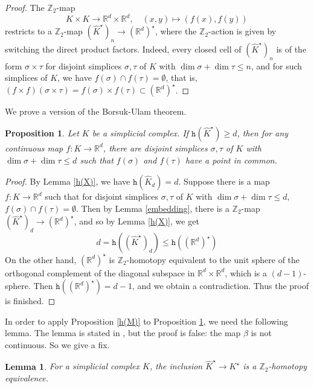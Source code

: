 \documentclass[amsfonts]{amsart}
\numberwithin{equation}{section}
\newtheorem{proposition}[theorem]{Proposition}
\newtheorem{lemma}[theorem]{Lemma}
\theoremstyle{definition}
\theoremstyle{remark}
\newcommand{\Z}{\mathbb{Z}}
\newcommand{\R}{\mathbb{R}}
\newcommand{\h}{\mathtt{h}}
\begin{document}
  \begin{proof}
    The $\Z_2$-map
    \[
      K\times K\to\R^d\times\R^d,\quad(x,y)\mapsto (f(x),f(y))
    \]
    restricts to a $\Z_2$-map $(\widehat{K}^\star)_n\to(\R^d)^\star$, where the $\Z_2$-action is given by switching the direct product factors. Indeed, every closed cell of $(\widehat{K}^\star)_n$ is of the form $\sigma\times\tau$ for disjoint simplices $\sigma,\tau$ of $K$ with $\dim\sigma+\dim\tau\le n$, and for such simplices of $K$, we have $f(\sigma)\cap f(\tau)=\emptyset$, that is, $(f\times f)(\sigma\times\tau)=f(\sigma)\times f(\tau)\subset(\R^d)^\star$.
  \end{proof}



  We prove a version of the Borsuk-Ulam theorem.



  \begin{proposition}
    \label{Borsuk-Ulam}
    Let $K$ be a simplicial complex. If $\h(\widehat{K}^\star)\ge d$, then for any continuous map $f\colon K\to\R^d$, there are disjoint simplices $\sigma,\tau$ of $K$ with $\dim\sigma+\dim\tau\le d$ such that $f(\sigma)$ and $f(\tau)$ have a point in common.
  \end{proposition}

  \begin{proof}
    By Lemma \ref{h(X)}, we have $\h(\widehat{K}_d)=d$. Suppose there is a map $f\colon K\to\R^d$ such that for disjoint simplices $\sigma,\tau$ of $K$ with $\dim\sigma+\dim\tau\le d$, $f(\sigma)\cap f(\tau)=\emptyset$. Then by Lemma \ref{embedding}, there is a $\Z_2$-map $(\widehat{K}^\star)_d\to(\R^d)^\star$, and so by Lemma \ref{h(X)}, we get
    \[
      d=\h((\widehat{K}^\star)_d)\le\h((\R^d)^\star)
    \]
    On the other hand, $(\R^d)^\star$ is $\Z_2$-homotopy equivalent to the unit sphere of the orthogonal complement of the diagonal subspace in $\R^d\times\R^d$, which is a $(d-1)$-sphere. Then $\h((\R^d)^\star)=d-1$, and we obtain a contradiction. Thus the proof is finished.
  \end{proof}




  In order to apply Proposition \ref{h(M)} to Proposition \ref{Borsuk-Ulam}, we need the following lemma. The lemma is stated in \cite[Lemma 2.1]{Sh}, but the proof is false: the map $\beta$ is not continuous. So we give a fix.



  \begin{lemma}
    \label{deleted product}
    For a simplicial complex $K$, the inclusion $\widehat{K}^\star\to K^\star$ is a $\Z_2$-homotopy equivalence.
  \end{lemma}
\end{document}
